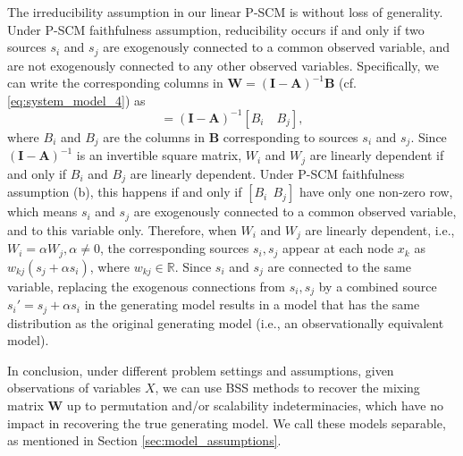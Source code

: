 \documentclass[12pt]{article}
\newcommand{\bA}{\mathbf{A}}
\newcommand{\bB}{\mathbf{B}}
\newcommand{\bW}{\mathbf{W}}
\newcommand{\bI}{\mathbf{I}}
\begin{document}
The irreducibility assumption in our linear P-SCM is without loss of generality. Under P-SCM faithfulness assumption, reducibility
occurs if and only if two sources $s_i$ and $s_j$ are exogenously connected to a common observed variable, and are not exogenously connected to any other observed variables. 
Specifically, we can write the corresponding columns in $\bW=(\bI-\bA)^{-1}\bB$ (cf. \eqref{eq:system_model_4}) as
\begin{equation*}
[W_i\quad W_j]=(\bI-\bA)^{-1} [B_i\quad B_j],
\end{equation*}
where $B_i$ and $B_j$ are the columns in $\bB$ corresponding to sources $s_i$ and $s_j$. Since $(\bI-\bA)^{-1}$ is an invertible square matrix, $W_i$ and $W_j$ are linearly dependent if and only if $B_i$ and $B_j$ are linearly dependent. Under P-SCM faithfulness assumption (b), this happens if and only if $[B_i~~ B_j]$ have only one non-zero row, which means $s_i$ and $s_j$ are exogenously connected to a common observed variable, and to this variable only. Therefore, when $W_i$ and $W_j$ are linearly dependent, i.e., $W_i=\alpha W_j, \alpha\neq 0$, the corresponding sources $s_i,s_j$ appear at each node $x_k$ as $w_{kj}(s_j+\alpha s_i)$, where $w_{kj}\in \mathbb{R}$. Since $s_i$ and $s_j$ are connected to the same variable, replacing the exogenous connections from $s_i,s_j$ by a combined source $s_i'=s_j+\alpha s_i$ in the generating model results in a model that has the same distribution as the original generating model (i.e., an observationally equivalent model). 

In conclusion, under different problem settings and assumptions, given observations of variables $X$, we can use BSS methods to recover the mixing matrix $\mathbf{W}$ up to permutation and/or scalability indeterminacies, which have no impact in recovering the true generating model. We call these models separable, as mentioned in Section \ref{sec:model_assumptions}. 
\end{document}
